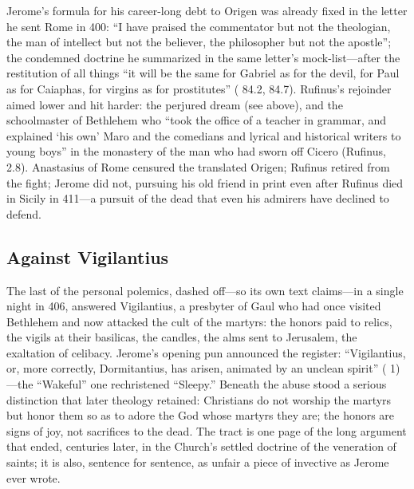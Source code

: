 Jerome's formula for his career-long debt to Origen was already fixed in the
letter he sent Rome in 400: ``I have praised the commentator but not the
theologian, the man of intellect but not the believer, the philosopher but
not the apostle''; the condemned doctrine he summarized in the same letter's
mock-list---after the restitution of all things ``it will be the same for
Gabriel as for the devil, for Paul as for Caiaphas, for virgins as for
prostitutes'' ( 84.2, 84.7). Rufinus's rejoinder aimed lower and
hit harder: the perjured dream (see above), and the schoolmaster of
Bethlehem who ``took the office of a teacher in grammar, and explained `his
own' Maro and the comedians and lyrical and historical writers to young
boys'' in the monastery of the man who had sworn off Cicero (Rufinus,
 2.8). Anastasius of Rome censured the translated Origen;
Rufinus retired from the fight; Jerome did not, pursuing his old friend in
print even after Rufinus died in Sicily in 411---a pursuit of the dead that
even his admirers have declined to defend.


\subsection{Against Vigilantius}

The last of the personal polemics, dashed off---so its own text claims---in a
single night in 406, answered Vigilantius, a presbyter of Gaul who had once
visited Bethlehem and now attacked the cult of the martyrs: the honors paid
to relics, the vigils at their basilicas, the candles, the alms sent to
Jerusalem, the exaltation of celibacy. Jerome's opening pun announced the
register: ``Vigilantius, or, more correctly, Dormitantius, has arisen,
animated by an unclean spirit'' ( 1)---the
``Wakeful'' one rechristened ``Sleepy.'' Beneath the abuse stood a serious
distinction that later theology retained: Christians do not worship the
martyrs but honor them so as to adore the God whose martyrs they are; the
honors are signs of joy, not sacrifices to the dead. The tract is one page of
the long argument that ended, centuries later, in the Church's settled
doctrine of the veneration of saints; it is also, sentence for sentence, as
unfair a piece of invective as Jerome ever wrote.
